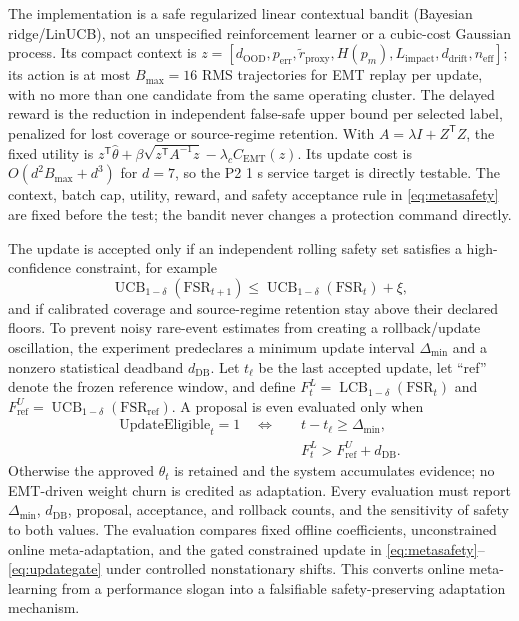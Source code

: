 \documentclass[conference]{IEEEtran}
\begin{document}
The implementation is a safe regularized linear contextual bandit (Bayesian ridge/LinUCB), not an unspecified reinforcement learner or a cubic-cost Gaussian process. Its compact context is $z=[d_{\mathrm{OOD}},p_{\mathrm{err}},\widetilde r_{\mathrm{proxy}},H(p_m),L_{\mathrm{impact}},d_{\mathrm{drift}},n_{\mathrm{eff}}]$; its action is at most $B_{\max}=16$ RMS trajectories for EMT replay per update, with no more than one candidate from the same operating cluster. The delayed reward is the reduction in independent false-safe upper bound per selected label, penalized for lost coverage or source-regime retention. With $A=\lambda I+Z^{\mathsf T}Z$, the fixed utility is $z^{\mathsf T}\hat\theta+\beta\sqrt{z^{\mathsf T}A^{-1}z}-\lambda_cC_{\mathrm{EMT}}(z)$. Its update cost is $O(d^2B_{\max}+d^3)$ for $d=7$, so the P2 1 s service target is directly testable. The context, batch cap, utility, reward, and safety acceptance rule in \eqref{eq:metasafety} are fixed before the test; the bandit never changes a protection command directly.

The update is accepted only if an independent rolling safety set satisfies a high-confidence constraint, for example
\begin{equation}
\operatorname{UCB}_{1-\delta}\!\left(\mathrm{FSR}_{t+1}\right)
\leq\operatorname{UCB}_{1-\delta}\!\left(\mathrm{FSR}_{t}\right)+\xi,
\label{eq:metasafety}
\end{equation}
and if calibrated coverage and source-regime retention stay above their declared floors. To prevent noisy rare-event estimates from creating a rollback/update oscillation, the experiment predeclares a minimum update interval $\Delta_{\min}$ and a nonzero statistical deadband $d_{\mathrm{DB}}$. Let $t_\ell$ be the last accepted update, let ``ref'' denote the frozen reference window, and define $F_t^{L}=\operatorname{LCB}_{1-\delta}(\mathrm{FSR}_t)$ and $F_{\mathrm{ref}}^{U}=\operatorname{UCB}_{1-\delta}(\mathrm{FSR}_{\mathrm{ref}})$. A proposal is even evaluated only when
\begin{equation}
\begin{aligned}
\mathrm{UpdateEligible}_{t}=1\quad\Longleftrightarrow\quad
& t-t_\ell\geq\Delta_{\min},\\
& F_t^{L}>F_{\mathrm{ref}}^{U}+d_{\mathrm{DB}}.
\end{aligned}
\label{eq:updategate}
\end{equation}
Otherwise the approved $\theta_t$ is retained and the system accumulates evidence; no EMT-driven weight churn is credited as adaptation. Every evaluation must report $\Delta_{\min}$, $d_{\mathrm{DB}}$, proposal, acceptance, and rollback counts, and the sensitivity of safety to both values. The evaluation compares fixed offline coefficients, unconstrained online meta-adaptation, and the gated constrained update in \eqref{eq:metasafety}--\eqref{eq:updategate} under controlled nonstationary shifts. This converts online meta-learning from a performance slogan into a falsifiable safety-preserving adaptation mechanism.
\end{document}
